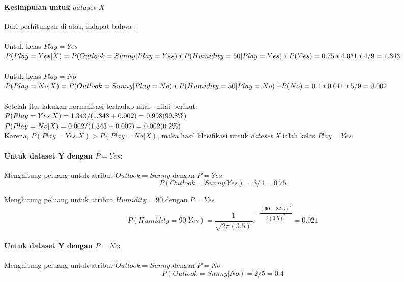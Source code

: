 	\paragraph{Kesimpulan untuk $dataset$ $X$}
	Dari perhitungan di atas, didapat bahwa : \\ \\
	Untuk kelas $Play=Yes$ \\
	$P(Play=Yes|X) \\
	= P(Outlook=Sunny|Play=Yes)*P(Humidity=50|Play=Yes)*P(Yes) \\
	= 0.75 * 4.031 * 4/9 \\
	= 1.343$ \\ \\
	Untuk kelas $Play=No$ \\
	$P(Play=No|X) \\
	= P(Outlook=Sunny|Play=No)*P(Humidity=50|Play=No)*P(No) \\
	= 0.4 * 0.011 * 5/9 \\
	= 0.002$ \\ \\
	Setelah itu, lakukan normalisasi terhadap nilai - nilai berikut: \\
	$P(Play=Yes|X) = 1.343 / (1.343+0.002) \\
	= 0.998 (99.8\%)$ \\
	$P(Play=No|X) = 0.002 / (1.343+0.002) \\
	= 0.002 (0.2\%)$ \\
	
	Karena, $P(Play=Yes|X) > P(Play=No|X)$, maka hasil klasifikasi untuk \textit{dataset X} ialah kelas $Play=Yes$.
	
	\paragraph{Untuk dataset Y dengan $P=Yes$:}
	Menghitung peluang untuk atribut $Outlook=Sunny$ dengan $P=Yes$
	\begin{displaymath}
			P(Outlook=Sunny|Yes) = 3/4 
			= 0.75
	\end{displaymath}
	
	Menghitung peluang untuk atribut $Humidity=90$ dengan $P=Yes$
		\begin{displaymath}
			P(Humidity=90|Yes) 
			= \dfrac{1}{\sqrt{2\pi(3.5)}}e^{-\dfrac{(\textbf{90}-82.5)^2}{2(3.5)^2}}
			= 0.021
		\end{displaymath}
	
	\paragraph{Untuk dataset Y dengan $P=No$:}
	Menghitung peluang untuk atribut $Outlook=Sunny$ dengan $P=No$
	\begin{displaymath}
				P(Outlook=Sunny|No)
				= 2/5 
				= 0.4
		\end{displaymath}
	
